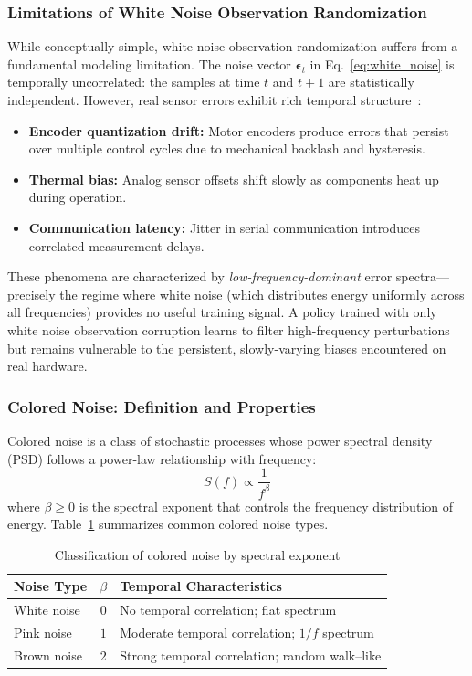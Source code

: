 \subsubsection{Limitations of White Noise Observation Randomization}

While conceptually simple, white noise observation randomization suffers from a fundamental modeling limitation.
The noise vector $\boldsymbol{\epsilon}_t$ in Eq.~\eqref{eq:white_noise} is temporally uncorrelated: the samples at time $t$ and $t+1$ are statistically independent.
However, real sensor errors exhibit rich temporal structure~\cite{eberhard2023pink}:
\begin{itemize}
  \item \textbf{Encoder quantization drift:} Motor encoders produce errors that persist over multiple control cycles due to mechanical backlash and hysteresis.
  \item \textbf{Thermal bias:} Analog sensor offsets shift slowly as components heat up during operation.
  \item \textbf{Communication latency:} Jitter in serial communication introduces correlated measurement delays.
\end{itemize}

These phenomena are characterized by \emph{low-frequency-dominant} error spectra---precisely the regime where white noise (which distributes energy uniformly across all frequencies) provides no useful training signal.
A policy trained with only white noise observation corruption learns to filter high-frequency perturbations but remains vulnerable to the persistent, slowly-varying biases encountered on real hardware.

\subsubsection{Colored Noise: Definition and Properties}

Colored noise is a class of stochastic processes whose power spectral density (PSD) follows a power-law relationship with frequency:
\begin{equation}
  S(f) \propto \frac{1}{f^{\beta}}
  \label{eq:psd}
\end{equation}
where $\beta \geq 0$ is the spectral exponent that controls the frequency distribution of energy.
Table~\ref{tab:noise_types} summarizes common colored noise types.

\begin{table}[htbp]
  \centering
  \caption{Classification of colored noise by spectral exponent}
  \label{tab:noise_types}
  \begin{tabular}{lcl}
    \toprule
    Noise Type & $\beta$ & Temporal Characteristics \\
    \midrule
    White noise & $0$ & No temporal correlation; flat spectrum \\
    Pink noise  & $1$ & Moderate temporal correlation; $1/f$ spectrum \\
    Brown noise & $2$ & Strong temporal correlation; random walk--like \\
    \bottomrule
  \end{tabular}
\end{table}

